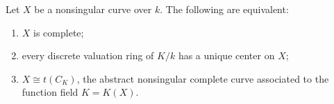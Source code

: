 Let $X$ be a nonsingular curve over $k$. The following are equivalent:
\begin{enumerate}
\item[(i)] $X$ is complete;
\item[(ii)] every discrete valuation ring of $K/k$ has a unique center on $X$;
\item[(iii)] $X \cong t(C_K)$, the abstract nonsingular complete curve associated to the function field $K = K(X)$.
\end{enumerate}
